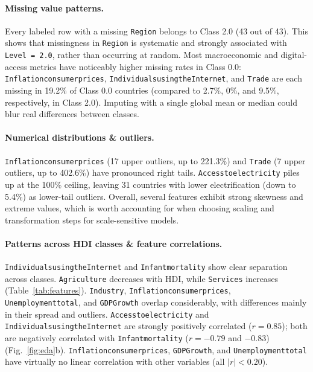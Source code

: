 \documentclass[11pt,a4paper]{article}
\renewcommand{\_}{\oldus\allowbreak}
\begin{document}
\paragraph{Missing value patterns.} Every labeled row with a missing
\texttt{Region} belongs to Class 2.0 (43 out of 43). This shows that
missingness in \texttt{Region} is systematic and strongly associated with
\texttt{Level = 2.0}, rather than occurring at random. Most macroeconomic
and digital-access metrics have noticeably higher missing rates in Class
0.0: \texttt{Inflation\_consumer\_prices},
\texttt{Individuals\_using\_the\_Internet}, and \texttt{Trade} are each
missing in 19.2\% of Class 0.0 countries (compared to 2.7\%, 0\%, and 9.5\%,
respectively, in Class 2.0). Imputing with a single global mean or median
could blur real differences between classes.

\paragraph{Numerical distributions \& outliers.}
\texttt{Inflation\_consumer\_prices} (17 upper outliers, up to 221.3\%) and
\texttt{Trade} (7 upper outliers, up to 402.6\%) have pronounced right
tails. \texttt{Access\_to\_electricity} piles up at the 100\% ceiling,
leaving 31 countries with lower electrification (down to 5.4\%) as
lower-tail outliers. Overall, several features exhibit strong skewness and
extreme values, which is worth accounting for when choosing scaling and
transformation steps for scale-sensitive models.

\paragraph{Patterns across HDI classes \& feature correlations.}
\texttt{Individuals\_using\_the\_Internet} and \texttt{Infant\_mortality}
show clear separation across classes. \texttt{Agriculture} decreases with
HDI, while \texttt{Services} increases (Table~\ref{tab:features}).
\texttt{Industry}, \texttt{Inflation\_consumer\_prices},
\texttt{Unemployment\_total}, and \texttt{GDP\_Growth} overlap considerably,
with differences mainly in their spread and outliers.
\texttt{Access\_to\_electricity} and \texttt{Individuals\_using\_the\_Internet}
are strongly positively correlated ($r=0.85$); both are negatively correlated
with \texttt{Infant\_mortality} ($r=-0.79$ and $-0.83$)
(Fig.~\ref{fig:eda}b). \texttt{Inflation\_consumer\_prices},
\texttt{GDP\_Growth}, and \texttt{Unemployment\_total} have virtually no
linear correlation with other variables (all $|r|<0.20$).
\end{document}
